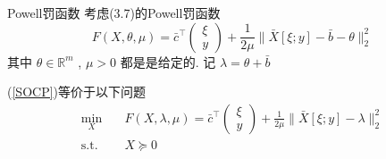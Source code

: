 \documentclass[slidestop,compress,mathserif,UTF8]{beamer}
\numberwithin{equation}{section}
\begin{document}
            \begin{frame}[t]{Powell罚函数}
                考虑(3.7)的Powell罚函数
                \begin{equation}\label{Powell}
                        F(X, \theta, \mu)
                    =	\bar{c}^\top \begin{pmatrix}\xi \\ y\end{pmatrix} + \frac{1}{2\mu} \lVert{\bar{X}[\xi; y] - \bar{b}- \theta}\rVert^2_2
                \end{equation}
                其中 $\theta \in \mathbb{R}^{m}$ , $\mu > 0$ 都是是给定的. 记 $\lambda = \theta + \bar{b}$

                (\ref{SOCP})等价于以下问题
                \begin{equation}
                    \begin{split}\label{PowellQ}
                        \min_{X} \quad
                            & F(X, \lambda, \mu) = \bar{c}^\top \begin{pmatrix}\xi \\ y\end{pmatrix} + \frac{1}{2\mu} \lVert{\bar{X}[\xi; y] - \lambda}\rVert^2_2\\
                        \text{s.t.} \quad
                            & X \succeq 0
                    \end{split}
                \end{equation} 
            \end{frame}
\end{document}
